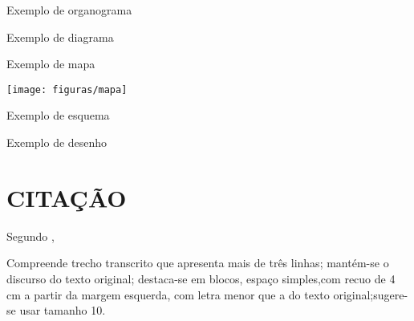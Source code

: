 \begin{organograma}[htb]
	\caption{Exemplo de organograma}
	\label{orga:grafico5}
\end{organograma}
\begin{diagrama}[htb]
	\caption{Exemplo de diagrama}
	\label{diag:grafico6}
\end{diagrama}

\begin{mapa}[htb]
	\caption{Exemplo de mapa}
	\label{map:grafico7}
 	\texttt{[image: figuras/mapa]}
\end{mapa}

\begin{esquema}[htb]
	\caption{Exemplo de esquema}
	\label{esq:grafico10}
\end{esquema}

\clearpage

\begin{desenho}[htb]
	\caption{Exemplo de desenho}
	\label{des:grafico9}
\end{desenho}
\cleardoublepage

\section{CITAÇÃO}

Segundo  ,
\begin{citacao}
Compreende trecho transcrito que apresenta mais de três linhas; mantém-se o discurso do texto original; destaca-se em blocos, espaço simples,com recuo de 4 cm a partir da margem esquerda, com letra menor que a do texto original;sugere-se usar tamanho 10.
\end{citacao}

